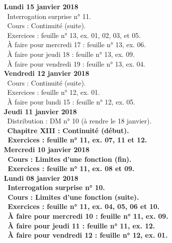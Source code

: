 \documentclass[12pt,a4paper]{article}
\begin{document}
\noindent\textbf{Lundi 15 janvier 2018} \\
\bu\ Interrogation surprise n° 11.\\
\bu\ Cours : Continuité (suite).\\
\bu\ Exercices : feuille n° 13, ex. 01, 02, 03, et 05.\\
\bu\ À faire pour mercredi 17 : feuille n° 13, ex. 06.\\
\bu\ À faire pour jeudi 18 : feuille n° 13, ex. 09.\\
\bu\ À faire pour vendredi 19 : feuille n° 13, ex. 04.\vspace{.4cm}\\

\noindent\textbf{Vendredi 12 janvier 2018}\\
\bu\ Cours : Continuité (suite).\\
\bu\ Exercices : feuille n° 12, ex. 01.\\
\bu\ À faire pour lundi 15 : feuille n° 12, ex. 05.\vspace{.4cm}\\

\noindent\textbf{Jeudi 11 janvier 2018}\\
\bu\ Distribution : DM n° 10 (à rendre le 18 janvier).\\
\bu\ \bf Chapitre XIII \rm : Continuité (début).\\
\bu\ Exercices : feuille n° 11, ex. 07, 11 et 12.\vspace{.4cm}\\

\noindent\textbf{Mercredi 10 janvier 2018} \\
\bu\ Cours : Limites d'une fonction (fin).\\
\bu\ Exercices : feuille n° 11, ex. 08 et 09.\vspace{.4cm}\\

\noindent\textbf{Lundi 08 janvier 2018} \\
\bu\ Interrogation surprise n° 10.\\
\bu\ Cours : Limites d'une fonction (suite).\\
\bu\ Exercices : feuille n° 11, ex. 04, 05, 06 et 10.\\
\bu\ À faire pour mercredi 10 : feuille n° 11, ex. 09.\\
\bu\ À faire pour jeudi 11 : feuille n° 11, ex. 12.\\
\bu\ À faire pour vendredi 12 : feuille n° 12, ex. 01.\vspace{.4cm}\\
\end{document}
